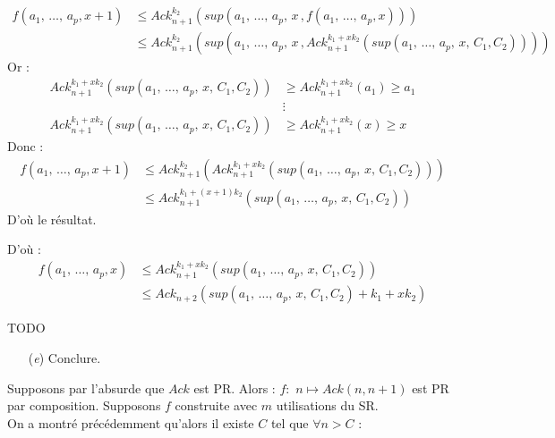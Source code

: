 \documentclass[12pt,letterpaper,boxed]{hmcpset}
\begin{document}
\begin{solution}
\begin{solution}[(d)]
\begin{itemize}
\begin{itemize}[leftmargin=*]
		\begin{align*}
			f(a_{1}, \, \dots , \, a_{p}, x+1) & \leq Ack^{k_{2}}_{n+1}(sup(a_{1}, \, \dots , \, a_{p}, \, x \, , f(a_{1}, \, \dots , \, a_{p}, x) )) \\
			& \leq Ack^{k_{2}}_{n+1}(sup(a_{1}, \, \dots , \, a_{p}, \, x \, , Ack^{k_{1} + xk_{2}}_{n+1}(sup(a_{1}, \, \dots , \, a_{p},  \, x, \, C_{1}, C_{2})) ))
		\end{align*}
		\noindent Or : 
		\begin{align*}
		Ack^{k_{1} + xk_{2}}_{n+1}(sup(a_{1}, \, \dots , \, a_{p},  \, x, \, C_{1}, C_{2})) & \geq  Ack^{k_{1} + xk_{2}}_{n+1}(a_{1}) \geq a_{1} \\
		& \vdots  \\
		Ack^{k_{1} + xk_{2}}_{n+1}(sup(a_{1}, \, \dots , \, a_{p},  \, x, \, C_{1}, C_{2})) & \geq  Ack^{k_{1} + xk_{2}}_{n+1}(x) \geq x
		\end{align*}
		Donc :
		\begin{align*}
			f(a_{1}, \, \dots , \, a_{p}, x+1) 
& \leq Ack^{k_{2}}_{n+1}(Ack^{k_{1} + xk_{2}}_{n+1}(sup(a_{1}, \, \dots , \, a_{p},  \, x, \, C_{1}, C_{2})) ) \\
		& \leq Ack^{k_{1} + (x+1)k_{2}}_{n+1}(sup(a_{1}, \, \dots , \, a_{p},  \, x, \, C_{1}, C_{2})) 
		\end{align*}
		D'où le résultat.
	\end{itemize}

\newpage 

\noindent D'où : 
\begin{align*}
f(a_{1}, \, \dots , \, a_{p}, x) & \leq  Ack^{k_{1} + xk_{2}}_{n+1}(sup(a_{1}, \, \dots , \, a_{p}, \, x, \,  C_{1}, C_{2})) \\
& \leq  Ack_{n+2}(sup(a_{1}, \, \dots , \, a_{p}, \, x, \,  C_{1}, C_{2})+k_{1} + xk_{2})
\end{align*}

TODO

\end{itemize}

\end{solution}

\begin{problem}
\begin{itemize}  
  \item[(\textit{e})]  Conclure. \end{itemize}
 \end{problem}
 
  \begin{solution}[(e)]
  Supposons par l'absurde que $Ack$ est PR. Alors : $f: \, \, n \mapsto Ack(n,n+1)$ est PR par composition. Supposons $f$ construite avec $m$ utilisations du SR.\\
   On a montré précédemment qu'alors il existe $C$ tel que $\forall n > C$ :
   

\end{solution}
\end{solution}
\end{document}
